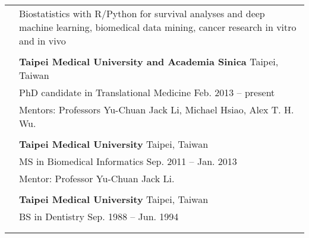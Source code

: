 \documentclass[letterpaper, 11pt]{article}
\begin{document}
\begin{longtable}{p{1.3in}p{4.8in}}


\nohyphens{\color{OliveGreen}{Research interests}}
& Biostatistics with R/Python for survival analyses and deep machine learning,  biomedical data mining, cancer research in vitro and in vivo \\
& \\


\color{OliveGreen}{Education} 
& \textbf{Taipei Medical University and Academia Sinica} \hfill Taipei, Taiwan \\ 
& PhD candidate in Translational Medicine \hfill Feb. 2013 -- present \\
& Mentors: Professors Yu-Chuan Jack Li, Michael Hsiao, Alex T. H. Wu. \\
& \\

& \textbf{Taipei Medical University} \hfill Taipei, Taiwan \\
& MS in Biomedical Informatics \hfill Sep. 2011 -- Jan. 2013\\
& Mentor: Professor Yu-Chuan Jack Li.\\ %
& \\

& \textbf{Taipei Medical University} \hfill Taipei, Taiwan \\
& BS in Dentistry \hfill Sep. 1988 -- Jun. 1994 \\
& \\%
& \\




\end{longtable}
\end{document}
